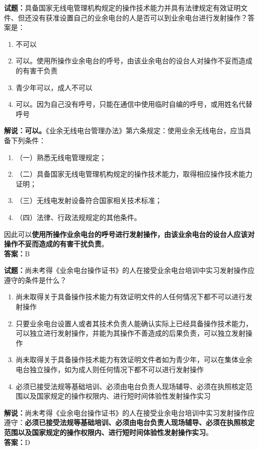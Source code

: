\documentclass{ctexbook}
\begin{document}
\vspace{1em}

\textbf{试题：}具备国家无线电管理机构规定的操作技术能力并具有法律规定有效证明文件、但还没有获准设置自己的业余电台的人是否可以到业余电台进行发射操作？答案是：
\begin{enumerate}[leftmargin=3em]
  \item 不可以
  \item 可以。使用所操作业余电台的呼号，由该业余电台的设台人对操作不妥而造成的有害干负责
  \item 青少年可以，成人不可以
  \item 可以。因为自己没有呼号，只能在通信中使用临时自编的呼号，或用姓名代替呼号
\end{enumerate}
\noindent\textbf{解说：可以。}《业余无线电台管理办法》第六条规定：使用业余无线电台，应当具备下列条件：
\begin{enumerate}[label=, leftmargin=0.8em]
  \item （一）熟悉无线电管理规定；
  \item （二）具备国家无线电管理机构规定的操作技术能力，取得相应操作技术能力证明；
  \item （三）无线电发射设备符合国家相关技术标准；
  \item （四）法律、行政法规规定的其他条件。
\end{enumerate}
因此可以\textbf{使用所操作业余电台的呼号进行发射操作，由该业余电台的设台人应该对操作不妥而造成的有害干扰负责}。\\\noindent\textbf{答案：}B

\vspace{1em}

\textbf{试题：}尚未考得《业余电台操作证书》的人在接受业余电台培训中实习发射操作应遵守的条件是什么？
\begin{enumerate}[leftmargin=3em]
  \item 尚未取得关于具备操作技术能力有效证明文件的人任何情况下都不可以进行发射操作
  \item 只要业余电台设置人或者其技术负责人能确认实际上已经具备操作技术能力，可以独立进行发射操作，并能为其操作不善造成的后果负责，可以独立发射操作
  \item 尚未取得关于具备操作技术能力有效证明文件者如为青少年，可以在集体业余电台独立操作，如为成人则任何情况下都不可以进行发射操作
  \item 必须已接受法规等基础培训、必须由电台负责人现场辅导、必须在执照核定范围以及国家规定的操作权限内、进行短时间体验性发射操作实习
\end{enumerate}
\noindent\textbf{解说：}尚未考得《业余电台操作证书》的人在接受业余电台培训中实习发射操作应遵守：\textbf{必须已接受法规等基础培训、必须由电台负责人现场辅导、必须在执照核定范围以及国家规定的操作权限内、进行短时间体验性发射操作实习}。\\\noindent\textbf{答案：}D
\end{document}

